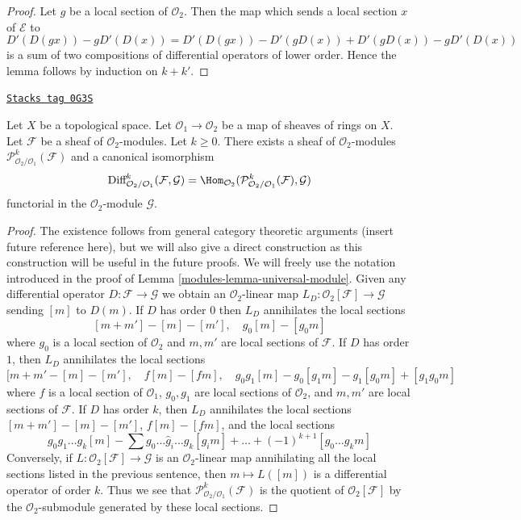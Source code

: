 \begin{proof}
Let $g$ be a local section of $\mathcal{O}_2$.
Then the map which sends a local section $x$ of $\mathcal{E}$ to
$$
D'(D(gx)) - gD'(D(x)) = D'(D(gx)) - D'(gD(x)) + D'(gD(x)) - gD'(D(x))
$$
is a sum of two compositions of differential operators of lower order.
Hence the lemma follows by induction on $k + k'$.
\end{proof}

\begin{lemma}
\label{modules-lemma-module-principal-parts}
\href{https://stacks.math.columbia.edu/tag/0G3S}{\texttt{Stacks tag 0G3S}}

Let $X$ be a topological space.
Let $\mathcal{O}_1 \to \mathcal{O}_2$ be a map of sheaves of rings on $X$.
Let $\mathcal{F}$ be a sheaf of $\mathcal{O}_2$-modules.
Let $k \geq 0$. There exists a sheaf of $\mathcal{O}_2$-modules
$\mathcal{P}^k_{\mathcal{O}_2/\mathcal{O}_1}(\mathcal{F})$
and a canonical isomorphism
$$
\text{Diff}^k_{\mathcal{O}_2/\mathcal{O}_1}(\mathcal{F}, \mathcal{G}) =
\Hom_{\mathcal{O}_2}(
\mathcal{P}^k_{\mathcal{O}_2/\mathcal{O}_1}(\mathcal{F}), \mathcal{G})
$$
functorial in the $\mathcal{O}_2$-module $\mathcal{G}$.
\end{lemma}

\begin{proof}

The existence follows from general category theoretic arguments
(insert future reference here), but we will also give a direct
construction as this construction will be useful in the future proofs.
We will freely use the notation introduced in the proof of
Lemma \ref{modules-lemma-universal-module}.
Given any differential operator $D : \mathcal{F} \to \mathcal{G}$
we obtain an $\mathcal{O}_2$-linear map
$L_D : \mathcal{O}_2[\mathcal{F}] \to \mathcal{G}$
sending $[m]$ to $D(m)$. If $D$ has order $0$
then $L_D$ annihilates the local sections
$$
[m + m'] - [m] - [m'],\quad
g_0[m] - [g_0m]
$$
where $g_0$ is a local section of $\mathcal{O}_2$ and $m, m'$
are local sections of $\mathcal{F}$. If $D$ has order $1$, then $L_D$
annihilates the local sections
$$
[m + m' - [m] - [m'],\quad
f[m] - [fm], \quad
g_0g_1[m] - g_0[g_1m] - g_1[g_0m] + [g_1g_0m]
$$
where $f$ is a local section of $\mathcal{O}_1$,
$g_0, g_1$ are local sections of $\mathcal{O}_2$, and
$m, m'$ are local sections of $\mathcal{F}$.
If $D$ has order $k$, then $L_D$ annihilates the local sections
$[m + m'] - [m] - [m']$, $f[m] - [fm]$, and the local sections
$$
g_0g_1\ldots g_k[m] - \sum g_0 \ldots \hat g_i \ldots g_k[g_im] + \ldots
+(-1)^{k + 1}[g_0\ldots g_km]
$$
Conversely, if $L : \mathcal{O}_2[\mathcal{F}] \to \mathcal{G}$ is an
$\mathcal{O}_2$-linear map annihilating all the local sections
listed in the previous sentence, then $m \mapsto L([m])$ is a
differential operator of order $k$. Thus we see that
$\mathcal{P}^k_{\mathcal{O}_2/\mathcal{O}_1}(\mathcal{F})$
is the quotient of $\mathcal{O}_2[\mathcal{F}]$
by the $\mathcal{O}_2$-submodule generated by these local sections.
\end{proof}


